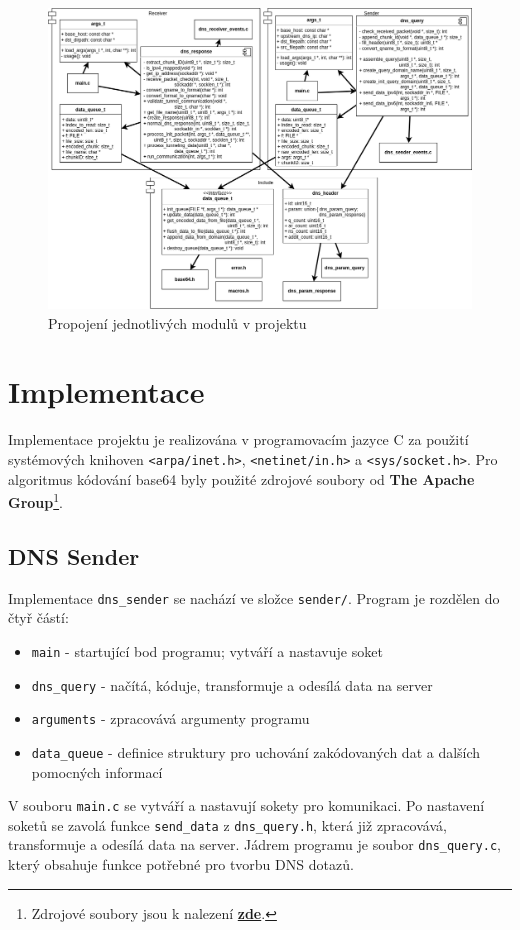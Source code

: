 \documentclass[a4paper,11pt]{article}
\begin{document}
    \begin{figure}[h]
        \centering
        \includegraphics[width=\textwidth]{module_diagram}
        \caption{Propojení jednotlivých modulů v projektu}
    \end{figure}
    \clearpage

    \section{Implementace}
    \label{sec:implementace}
    Implementace projektu je realizována v programovacím jazyce C za použití systémových knihoven
    \verb|<arpa/inet.h>|, \verb|<netinet/in.h>| a \verb|<sys/socket.h>|. Pro algoritmus kódování
    base64 byly použité zdrojové soubory od \textbf{The Apache Group}\footnote{Zdrojové soubory jsou k nalezení \href{https://opensource.apple.com/source/QuickTimeStreamingServer/QuickTimeStreamingServer-452/CommonUtilitiesLib/}{\textbf{zde}}.}.

    \subsection{DNS Sender}
    Implementace \verb|dns_sender| se nachází ve složce \verb|sender/|. Program je rozdělen do čtyř částí:
    \begin{itemize}
        \setlength\itemsep{1pt}
        \item \verb|main|       \-- startující bod programu; vytváří a nastavuje soket
        \item \verb|dns_query|  \-- načítá, kóduje, transformuje a odesílá data na server
        \item \verb|arguments|  \-- zpracovává argumenty programu
        \item \verb|data_queue| \-- definice struktury pro uchování zakódovaných dat a dalších pomocných informací
    \end{itemize}
    V souboru \verb|main.c| se vytváří a nastavují sokety pro komunikaci. Po nastavení soketů se zavolá funkce
    \verb|send_data| z \verb|dns_query.h|, která již zpracovává, transformuje a odesílá data na server. Jádrem programu
    je soubor \verb|dns_query.c|, který obsahuje funkce potřebné pro tvorbu DNS dotazů.
\end{document}
